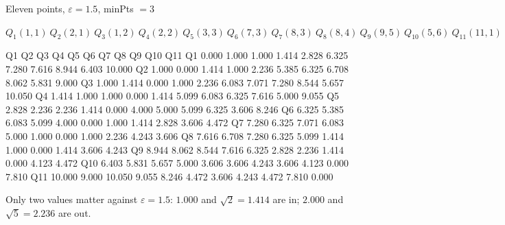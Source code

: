 \documentclass[aspectratio=169]{beamer}
\begin{document}
\begin{frame}[fragile,shrink=6]{Eleven points, $\varepsilon = 1.5$, minPts $= 3$}
  \begin{center}\small
    $Q_1(1,1)\ Q_2(2,1)\ Q_3(1,2)\ Q_4(2,2)\ Q_5(3,3)\ Q_6(7,3)\ Q_7(8,3)\
     Q_8(8,4)\ Q_9(9,5)\ Q_{10}(5,6)\ Q_{11}(11,1)$
  \end{center}
\begin{outblk}
          Q1     Q2     Q3     Q4     Q5     Q6     Q7     Q8     Q9    Q10    Q11
  Q1   0.000  1.000  1.000  1.414  2.828  6.325  7.280  7.616  8.944  6.403 10.000
  Q2   1.000  0.000  1.414  1.000  2.236  5.385  6.325  6.708  8.062  5.831  9.000
  Q3   1.000  1.414  0.000  1.000  2.236  6.083  7.071  7.280  8.544  5.657 10.050
  Q4   1.414  1.000  1.000  0.000  1.414  5.099  6.083  6.325  7.616  5.000  9.055
  Q5   2.828  2.236  2.236  1.414  0.000  4.000  5.000  5.099  6.325  3.606  8.246
  Q6   6.325  5.385  6.083  5.099  4.000  0.000  1.000  1.414  2.828  3.606  4.472
  Q7   7.280  6.325  7.071  6.083  5.000  1.000  0.000  1.000  2.236  4.243  3.606
  Q8   7.616  6.708  7.280  6.325  5.099  1.414  1.000  0.000  1.414  3.606  4.243
  Q9   8.944  8.062  8.544  7.616  6.325  2.828  2.236  1.414  0.000  4.123  4.472
  Q10  6.403  5.831  5.657  5.000  3.606  3.606  4.243  3.606  4.123  0.000  7.810
  Q11 10.000  9.000 10.050  9.055  8.246  4.472  3.606  4.243  4.472  7.810  0.000
\end{outblk}
  \vspace{0.1em}
  \begin{center}\scriptsize
    Only two values matter against $\varepsilon = 1.5$: $1.000$ and
    $\sqrt{2} = 1.414$ are in; $2.000$ and $\sqrt{5} = 2.236$ are out.
  \end{center}
\end{frame}
\end{document}
